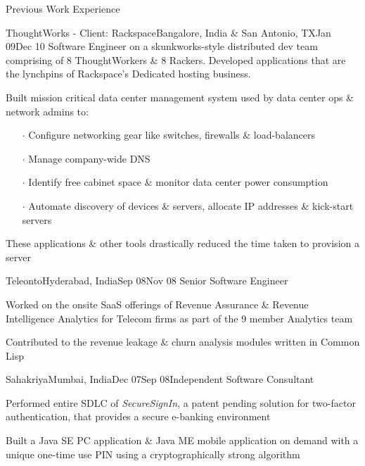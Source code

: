\documentclass{resume} %
\begin{document}
\begin{rSection}{Previous Work Experience}

\begin{rSubsection}{ThoughtWorks - Client: Rackspace}{Bangalore, India \& San Antonio,
  TX}{Jan 09}{Dec
    10}
{Software Engineer on a skunkworks-style distributed dev team comprising of 8
  ThoughtWorkers \& 8 Rackers. Developed applications that are the
  lynchpins of Rackspace's Dedicated hosting business.}

\item Built mission critical data center management system used by
  data center ops \& network admins to:
\vspace{-0.5em}
\begin{itemize}  \itemsep0.5pt \parskip0pt
    \item[$\cdot$] Configure networking gear like switches, firewalls \& load-balancers
    \item[$\cdot$] Manage company-wide DNS
    \item[$\cdot$] Identify free cabinet space \& monitor data center power consumption
    \item[$\cdot$] Automate discovery of devices \& servers, allocate IP addresses \& kick-start servers
\end{itemize}
\item These applications \& other tools drastically reduced the time taken to provision a server
\end{rSubsection}


\begin{rSubsection}{Teleonto}{Hyderabad, India}{Sep 08}{Nov 08}
{Senior Software Engineer}
\item Worked on the onsite SaaS offerings of Revenue Assurance \& Revenue Intelligence Analytics for Telecom firms as part of the 9 member Analytics team
\item Contributed to the revenue leakage \& churn analysis modules written in Common Lisp
\end{rSubsection}


\begin{rSubsection}{Sahakriya}{Mumbai, India}{Dec 07}{Sep 08}{Independent Software Consultant}
\item Performed entire SDLC of {\em SecureSignIn}, a patent pending solution for two-factor authentication, that provides a secure e-banking environment
\item Built a Java SE PC application \& Java ME mobile application on demand with a unique one-time use PIN using a cryptographically strong algorithm
\end{rSubsection}


\end{rSection}
\end{document}
